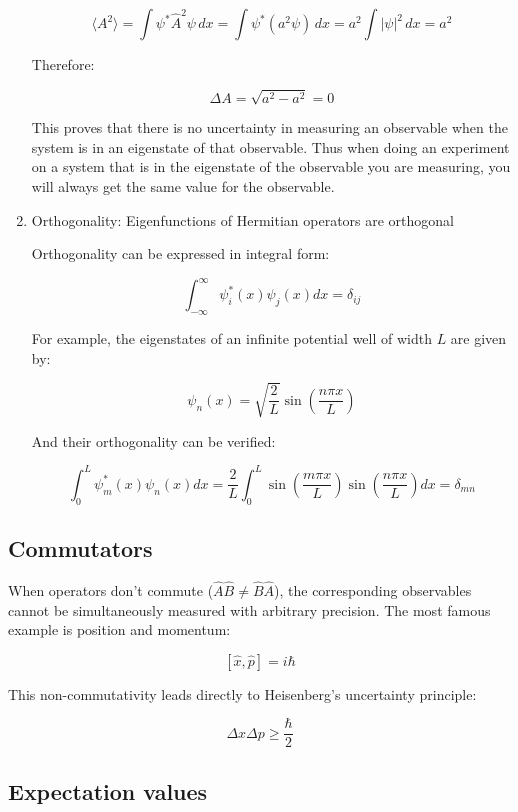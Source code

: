 \documentclass[
  a4paper,
]{book}
\begin{document}
\begin{enumerate}
\begin{tcolorbox}
  \[\langle A^2 \rangle = \int \psi^* \hat{A}^2 \psi \, dx = \int \psi^* (a^2\psi) \, dx = a^2 \int |\psi|^2 \, dx = a^2\]

  Therefore:

  \[\Delta A = \sqrt{a^2 - a^2} = 0\]

  This proves that there is no uncertainty in measuring an observable
  when the system is in an eigenstate of that observable. Thus when
  doing an experiment on a system that is in the eigenstate of the
  observable you are measuring, you will always get the same value for
  the observable.

  \end{tcolorbox}
\item
  Orthogonality: Eigenfunctions of Hermitian operators are orthogonal

  Orthogonality can be expressed in integral form:

  \[\int_{-\infty}^{\infty} \psi_i^*(x)\psi_j(x)dx = \delta_{ij}\]

  For example, the eigenstates of an infinite potential well of width
  \(L\) are given by:

  \[\psi_n(x) = \sqrt{\frac{2}{L}}\sin\left (\frac{n\pi x}{L}\right)\]

  And their orthogonality can be verified:

  \[\int_0^L \psi_m^*(x)\psi_n(x)dx = \frac{2}{L}\int_0^L \sin\left (\frac{m\pi x}{L}\right)\sin\left (\frac{n\pi x}{L}\right)dx = \delta_{mn}\]
\end{enumerate}

\subsection{Commutators}\label{commutators}

When operators don't commute (\(\hat{A}\hat{B} \neq \hat{B}\hat{A}\)),
the corresponding observables cannot be simultaneously measured with
arbitrary precision. The most famous example is position and momentum:

\[[\hat{x},\hat{p}] = i\hbar\]

This non-commutativity leads directly to Heisenberg's uncertainty
principle:

\[\Delta x \Delta p \geq \frac{\hbar}{2}\]

\subsection{Expectation values}\label{expectation-values}
\end{document}
